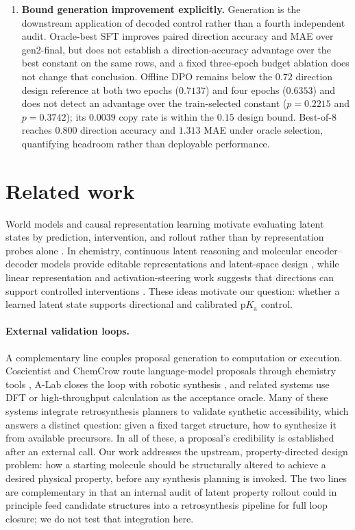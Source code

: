 \documentclass[11pt]{article}
\newcommand{\pka}{\mathrm{p}K_{\mathrm a}}
\begin{document}
\begin{enumerate}[leftmargin=1.5em]
  \item \textbf{Bound generation improvement explicitly.} Generation is the downstream application of decoded control rather than a fourth independent audit. Oracle-best SFT improves paired direction accuracy and MAE over gen2-final, but does not establish a direction-accuracy advantage over the best constant on the same rows, and a fixed three-epoch budget ablation does not change that conclusion. Offline DPO remains below the $0.72$ direction design reference at both two epochs ($0.7137$) and four epochs ($0.6353$) and does not detect an advantage over the train-selected constant ($p=0.2215$ and $p=0.3742$); its $0.0039$ copy rate is within the $0.15$ design bound. Best-of-8 reaches $0.800$ direction accuracy and $1.313$ MAE under oracle selection, quantifying headroom rather than deployable performance.
\end{enumerate}

\section{Related work}
\label{sec:related}

World models and causal representation learning motivate evaluating latent states by prediction, intervention, and rollout rather than by representation probes alone \citep{Ha2018WorldModels,Hafner2025Dreamer,Scholkopf2021Causal}. In chemistry, continuous latent reasoning and molecular encoder--decoder models provide editable representations and latent-space design \citep{Hao2025Coconut,Ye2026LatentChem,Soares2025SMITED,Eckmann2022LIMO}, while linear representation and activation-steering work suggests that directions can support controlled interventions \citep{Park2024Linear,Turner2024ActAdd}. These ideas motivate our question: whether a learned latent state supports directional and calibrated $\pka$ control.

\paragraph{External validation loops.} A complementary line couples proposal generation to computation or execution. Coscientist and ChemCrow route language-model proposals through chemistry tools \citep{Boiko2023Coscientist,Bran2024ChemCrow}, A-Lab closes the loop with robotic synthesis \citep{Szymanski2023ALab}, and related systems use DFT or high-throughput calculation as the acceptance oracle. Many of these systems integrate retrosynthesis planners to validate synthetic accessibility, which answers a distinct question: given a fixed target structure, how to synthesize it from available precursors. In all of these, a proposal's credibility is established after an external call. Our work addresses the upstream, property-directed design problem: how a starting molecule should be structurally altered to achieve a desired physical property, before any synthesis planning is invoked. The two lines are complementary in that an internal audit of latent property rollout could in principle feed candidate structures into a retrosynthesis pipeline for full loop closure; we do not test that integration here.
\end{document}

